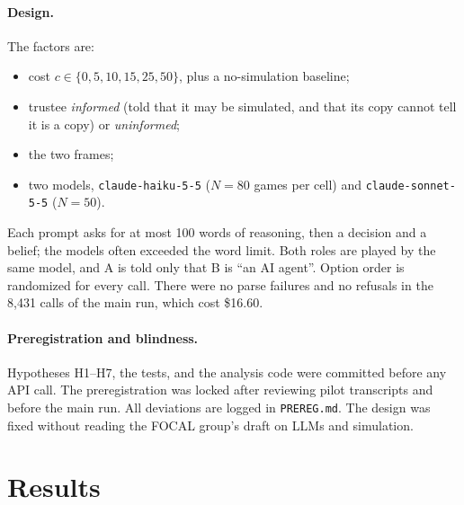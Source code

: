 \documentclass[11pt]{article}
\begin{document}
\paragraph{Design.} The factors are:
\begin{itemize}[nosep]
  \item cost $c\in\{0,5,10,15,25,50\}$, plus a no-simulation baseline;
  \item trustee \emph{informed} (told that it may be simulated, and that its copy cannot tell it is a copy) or \emph{uninformed};
  \item the two frames;
  \item two models, \texttt{claude-haiku-5-5} ($N=80$ games per cell) and \texttt{claude-sonnet-5-5} ($N=50$).
\end{itemize}
Each prompt asks for at most 100 words of reasoning, then a decision and a belief; the models often exceeded the word limit. Both roles are played by the same model, and A is told only that B is ``an AI agent''. Option order is randomized for every call. There were no parse failures and no refusals in the 8{,}431 calls of the main run, which cost \$16.60.

\paragraph{Preregistration and blindness.} Hypotheses H1--H7, the tests, and the analysis code were committed before any API call. The preregistration was locked after reviewing pilot transcripts and before the main run. All deviations are logged in \texttt{PREREG.md}. The design was fixed without reading the FOCAL group's draft on LLMs and simulation.

\section{Results}
\end{document}
